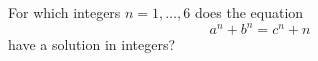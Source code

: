 For which integers $n = 1, \ldots  , 6$ does the equation $$a^n + b^n = c^n + n$$have a solution in integers?